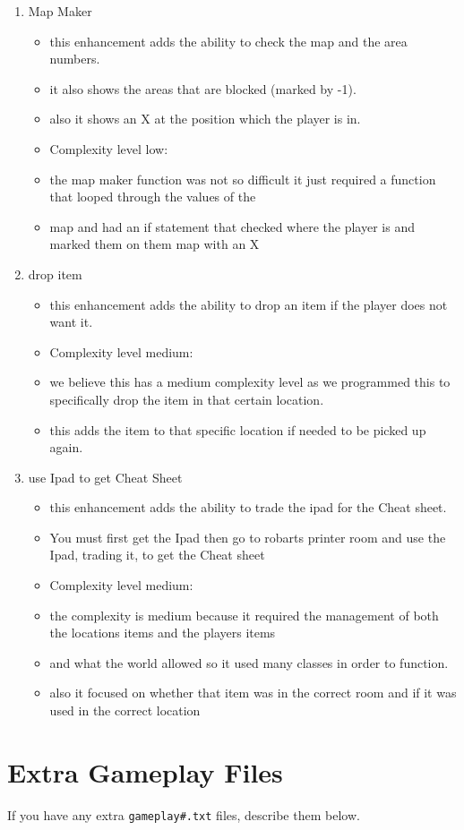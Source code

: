 \documentclass[11pt]{article}
\begin{document}
\begin{enumerate}
\item Map Maker
	\begin{itemize}
	\item this enhancement adds the ability to check the map and the area numbers.
	\item it also shows the areas that are blocked (marked by -1).
	\item also it shows an X at the position which the player is in.
	\item Complexity level low:
	\item the map maker function was not so difficult it just required a function that looped through the values of the
	\item map and had an if statement that checked where the player is and marked them on them map with an X
	\end{itemize}

\item drop item
	\begin{itemize}
	\item this enhancement adds the ability to drop an item if the player does not want it.
	\item Complexity level medium:
	\item we believe this has a medium complexity level as we programmed this to specifically drop the item in that certain location.
	\item this adds the item to that specific location if needed to be picked up again.
	\end{itemize}

\item use Ipad to get Cheat Sheet
	\begin{itemize}
	\item this enhancement adds the ability to trade the ipad for the Cheat sheet.
	\item You must first get the Ipad then go to robarts printer room and use the Ipad, trading it, to get the Cheat sheet
	\item Complexity level medium:
	\item the complexity is medium because it required the management of both the locations items and the players items
	\item and what the world allowed so it used many classes in order to function.
	\item also it focused on whether that item was in the correct room and if it was used in the correct location
	\end{itemize}


\end{enumerate}


\section*{Extra Gameplay Files}

If you have any extra \texttt{gameplay\#.txt} files, describe them below.
\end{document}
